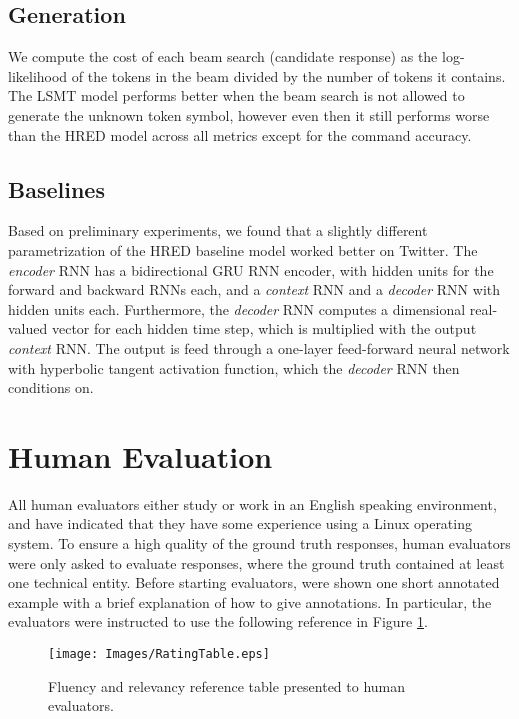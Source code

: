 \documentclass{article}
\begin{document}
\subsection*{Generation}
We compute the cost of each beam search (candidate response) as the log-likelihood of the tokens in the beam divided by the number of tokens it contains.
The LSMT model performs better when the beam search is not allowed to generate the unknown token symbol, however even then it still performs worse than the HRED model across all metrics except for the command accuracy.

\subsection*{Baselines}

Based on preliminary experiments,
we found that a slightly different parametrization of the HRED baseline model worked better on Twitter.
The \textit{encoder} RNN has a bidirectional GRU RNN encoder, with  hidden units for the forward and backward RNNs each, and a \textit{context} RNN and a \textit{decoder} RNN with  hidden units each.
Furthermore, the \textit{decoder} RNN computes a  dimensional real-valued vector for each hidden time step, which is multiplied with the output \textit{context} RNN. The output is feed through a one-layer feed-forward neural network with hyperbolic tangent activation function, which the \textit{decoder} RNN then conditions on.

\section{Human Evaluation} \label{app:human_eval}

All human evaluators either study or work in an English speaking environment,
and have indicated that they have some experience using a Linux operating system.
To ensure a high quality of the ground truth responses, human evaluators were only asked to evaluate responses, where the ground truth contained at least one technical entity.
Before starting evaluators, were shown one short annotated example with a brief explanation of how to give annotations.
In particular, the evaluators were instructed to use the following reference in Figure \ref{tab:fluency_relevancy_table}.

\begin{figure}[ht]
  \centering
  \texttt{[image: Images/RatingTable.eps]}
  \caption{Fluency and relevancy reference table presented to human evaluators.}
  \label{tab:fluency_relevancy_table}
\end{figure}
\end{document}
